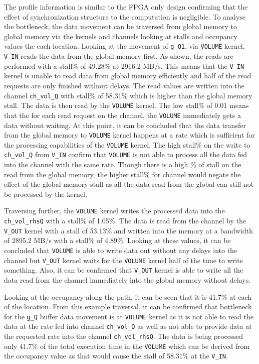The profile information is similar to the FPGA only design confirming
that the effect of synchronization structure to the computation is
negligible. To analyse the bottleneck, the data movement can be traversed
from global memory to global memory via the kernels and channels looking at
stalls and occupancy values the each location. Looking at the movement of
\texttt{g\_Q1}, via \texttt{VOLUME} kernel, \texttt{V\_IN} reads the data from the
global memory first. As shown, the reads are performed with a stall\%
of 49.28\% at 2916.2 MB/s. This means that the \texttt{V\_IN} kernel is unable to read
data from global memory efficiently and half of the read requests
are only finished without delays. The read values are written into
the channel \texttt{ch\_vol\_Q} with stall\% of 58.31\% which is higher
than the global memory stall. The data is then read by the \texttt{VOLUME}
kernel. The low stall\% of 0.01 means that the for each read request
on the channel, the \texttt{VOLUME} immediately gets a data without
waiting. At this point, it can be concluded that the data transfer from the global
memory to \texttt{VOLUME} kernel happens at a rate which is sufficient for
the processing capabilities of the \texttt{VOLUME} kernel. The high stall\%
on the write to \texttt{ch\_vol\_Q} from \texttt{V\_IN} confirm that
\texttt{VOLUME} is not able to process all the data fed into the channel
with the same rate. Though there is a high \% of stall on the read
from the global memory, the higher stall\% for channel would
negate the effect of the global memory stall as all the data
read from the global can still not be processed by the kernel.

Traversing further, the \texttt{VOLUME} kernel writes the processed
data into the \texttt{ch\_vol\_rhsQ} with a stall\% of 1.05\%.
The data is read from the channel by the \texttt{V\_OUT} kernel
with a stall of 53.13\% and written into the memory at a
bandwidth of 2895.2 MB/s with a stall\% of 4.89\%. Looking at these
values, it can be concluded that \texttt{VOLUME} is able to write data
out without any delays into the channel but \texttt{V\_OUT} kernel
waits for the \texttt{VOLUME} kernel half of the time to write
something. Also, it can be confirmed that \texttt{V\_OUT} kernel is
able to write all the data read from the channel immediately into
the global memory without delays.

Looking at the occupancy along the path, it can be seen that
it is 41.7\% at each of the location. From this example traversal,
it can be confirmed that bottleneck for the \texttt{g\_Q}
buffer data movement is at \texttt{VOLUME} kernel as it is not
able to read the data at the rate fed into channel
\texttt{ch\_vol\_Q} as well as not able to provide data at
the requested rate into the channel \texttt{ch\_vol\_rhsQ}.
The data is being processed only 41.7\% of the total execution
time in the \texttt{VOLUME} which can be derived from the occupancy
value as that would cause the stall of 58.31\% at the \texttt{V\_IN}.

